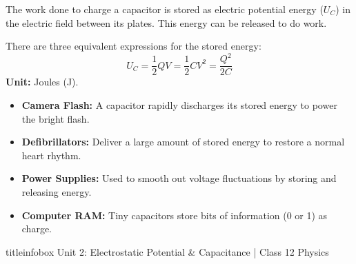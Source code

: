 \begin{frame}
\begin{frame}
\vspace{-0.05cm}

\begin{keybox}
\vspace{0.1cm}
The work done to charge a capacitor is stored as electric potential energy ($U_C$) in the electric field between its plates. This energy can be released to do work.
\vspace{0.1cm}
\end{keybox}

\vspace{0.35cm}

\begin{formulabox}
\vspace{0.1cm}
There are three equivalent expressions for the stored energy:
\begin{equation*}
\boxed{U_C = \frac{1}{2} Q V = \frac{1}{2} C V^2 = \frac{Q^2}{2C}}
\end{equation*}
\textbf{Unit:} Joules (J).
\vspace{0.1cm}
\end{formulabox}

\vspace{0.35cm}

\begin{examplebox}
\vspace{0.1cm}
\begin{itemize}
    \item \textbf{Camera Flash:} A capacitor rapidly discharges its stored energy to power the bright flash.
    \item \textbf{Defibrillators:} Deliver a large amount of stored energy to restore a normal heart rhythm.
    \item \textbf{Power Supplies:} Used to smooth out voltage fluctuations by storing and releasing energy.
    \item \textbf{Computer RAM:} Tiny capacitors store bits of information (0 or 1) as charge.
\end{itemize}
\vspace{0.1cm}
\end{examplebox}

\vfill

\begin{beamercolorbox}[wd=\textwidth,ht=0.5cm,dp=0.1cm,center]{titleinfobox}
    \small\color{coolgray} Unit 2: Electrostatic Potential & Capacitance | Class 12 Physics
\end{beamercolorbox}
\end{frame}


\end{frame}
